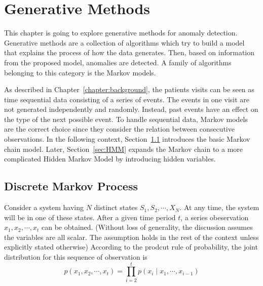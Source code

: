 \chapter{Generative Methods}
\label{chapter:generative}
This chapter is going to explore generative methods for anomaly detection. Generative methods are a collection of algorithms which try to build a model that explains the process of how the data generates. Then, based on information from the proposed model, anomalies are detected. A family of algorithms belonging to this category is the Markov models.

As described in Chapter~\ref{chapter:background}, the patients visits can be seen as time sequential data consisting of a series of events. The events in one visit are not generated independently and randomly. Instead, past events have an effect on the type of the next possible event. To handle sequential data, Markov models are the correct choice since they consider the relation between consecutive observations. In the following context, Section~\ref{sec:MM} introduces the basic Markov chain model. Later, Section~\ref{sec:HMM} expands the Markov chain to a more complicated Hidden Markov Model by introducing hidden variables.

\section{Discrete Markov Process}
\label{sec:MM}
Consider a system having \(N\) distinct states \(S_1, S_2, \cdots, X_N\). At any time, the system will be in one of these states. After a given time period \(t\), a series obeservation \(x_1, x_2, \cdots, x_t\) can be obtained. (Without loss of generality, the discussion assumes the variables are all scalar. The assumption holds in the rest of the context unless explicitly stated otherwise) According to the prodcut rule of probability, the joint distribution for this sequence of observation is
\begin{equation}
	p(x_1, x_2, \cdots, x_t) = \prod_{i = 2}^{t} p(x_i \mid x_1, \cdots, x_{i-1})
\end{equation}

